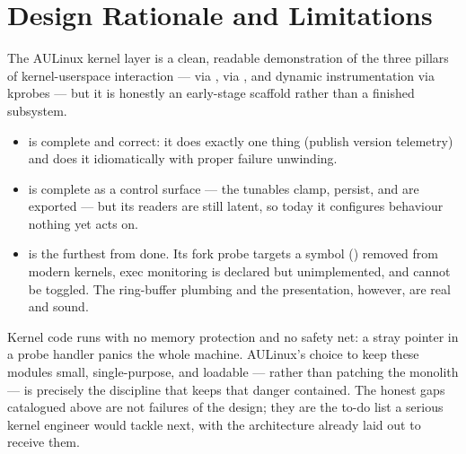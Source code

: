 \section{Design Rationale and Limitations}

The AULinux kernel layer is a clean, readable demonstration of the three pillars
of kernel-userspace interaction —  via ,
 via , and dynamic instrumentation via kprobes —
but it is honestly an early-stage scaffold rather than a finished subsystem.

\begin{itemize}
  \item \textbf{} is complete and correct: it does exactly
        one thing (publish version telemetry) and does it idiomatically with
        proper failure unwinding.
  \item \textbf{} is complete as a control surface — the
        tunables clamp, persist, and are exported — but its readers are still
        latent, so today it configures behaviour nothing yet acts on.
  \item \textbf{} is the furthest from done. Its fork
        probe targets a symbol () removed from modern kernels,
        exec monitoring is declared but unimplemented, and
         cannot be toggled. The ring-buffer plumbing
        and the  presentation, however, are real and sound.
\end{itemize}

\begin{infobox}
Kernel code runs with no memory protection and no safety net: a stray pointer in
a probe handler panics the whole machine. AULinux's choice to keep these modules
small, single-purpose, and loadable — rather than patching the monolith — is
precisely the discipline that keeps that danger contained. The honest gaps
catalogued above are not failures of the design; they are the to-do list a
serious kernel engineer would tackle next, with the architecture already laid
out to receive them.
\end{infobox}
